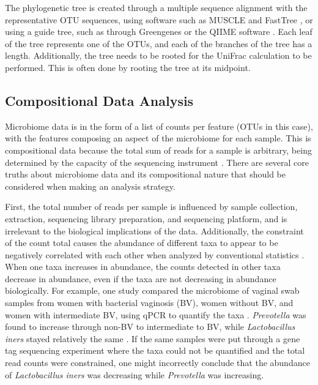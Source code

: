 \documentclass[10pt,letterpaper]{article}
\begin{document}
The phylogenetic tree is created through a multiple sequence alignment with the representative OTU sequences, using software such as MUSCLE \cite{edgar2004muscle} and FastTree \cite{price2010fasttree}, or using a guide tree, such as through Greengenes \cite{desantis2006greengenes} or the QIIME software \cite{caporaso2010qiime}. Each leaf of the tree represents one of the OTUs, and each of the branches of the tree has a length. Additionally, the tree needs to be rooted for the UniFrac calculation to be performed. This is often done by rooting the tree at its midpoint.

\subsection{Compositional Data Analysis}
Microbiome data is in the form of a list of counts per feature (OTUs in this case), with the features composing an aspect of the microbiome for each sample. This is compositional data because the total sum of reads for a sample is arbitrary, being determined by the capacity of the sequencing instrument \cite{fernandes2013anova} \cite{fernandes2014unifying} \cite{gloor2010microbiome}. There are several core truths about microbiome data and its compositional nature that should be considered when making an analysis strategy.

First, the total number of reads per sample is influenced by sample collection, extraction, sequencing library preparation, and sequencing platform, and is irrelevant to the biological implications of the data. Additionally, the constraint of the count total causes the abundance of different taxa to appear to be negatively correlated with each other when analyzed by conventional statistics \cite{lovell2015proportionality}. When one taxa increases in abundance, the counts detected in other taxa decrease in abundance, even if the taxa are not decreasing in abundance biologically. For example, one study compared the microbiome of vaginal swab samples from women with bacterial vaginosis (BV), women without BV, and women with intermediate BV, using qPCR to quantify the taxa \cite{zozaya2010quantitative}. \textit{Prevotella} was found to increase through non-BV to intermediate to BV, while \textit{Lactobacillus iners} stayed relatively the same \cite{zozaya2010quantitative}. If the same samples were put through a gene tag sequencing experiment where the taxa could not be quantified and the total read counts were constrained, one might incorrectly conclude that the abundance of \textit{Lactobacillus iners} was decreasing while \textit{Prevotella} was increasing.
\end{document}
